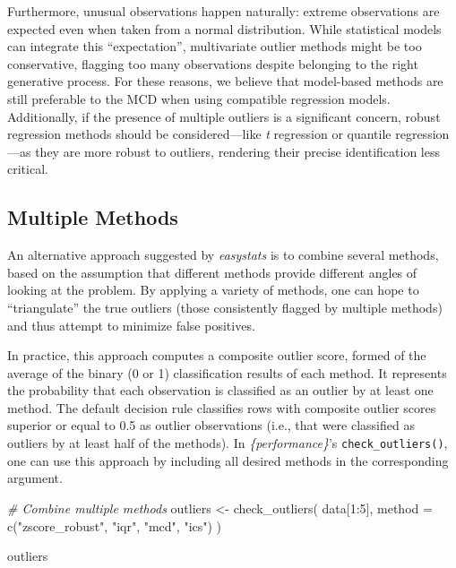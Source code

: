 \documentclass[mathematics,article,submit,moreauthors,pdftex]{mdpi}
\newenvironment{Shaded}{\begin{snugshade}}{\end{snugshade}}
\newcommand{\AttributeTok}[1]{\textcolor[rgb]{0.77,0.63,0.00}{#1}}
\newcommand{\CommentTok}[1]{\textcolor[rgb]{0.56,0.35,0.01}{\textit{#1}}}
\newcommand{\DecValTok}[1]{\textcolor[rgb]{0.00,0.00,0.81}{#1}}
\newcommand{\FunctionTok}[1]{\textcolor[rgb]{0.00,0.00,0.00}{#1}}
\newcommand{\NormalTok}[1]{#1}
\newcommand{\OtherTok}[1]{\textcolor[rgb]{0.56,0.35,0.01}{#1}}
\newcommand{\SpecialCharTok}[1]{\textcolor[rgb]{0.00,0.00,0.00}{#1}}
\newcommand{\StringTok}[1]{\textcolor[rgb]{0.31,0.60,0.02}{#1}}
\begin{document}
Furthermore, unusual observations happen naturally: extreme observations
are expected even when taken from a normal distribution. While
statistical models can integrate this ``expectation'', multivariate
outlier methods might be too conservative, flagging too many
observations despite belonging to the right generative process. For
these reasons, we believe that model-based methods are still preferable
to the MCD when using compatible regression models. Additionally, if the
presence of multiple outliers is a significant concern, robust
regression methods should be considered---like \emph{t} regression or
quantile regression---as they are more robust to outliers, rendering
their precise identification less critical.

\hypertarget{multiple-methods}{%
\subsection{Multiple Methods}\label{multiple-methods}}

An alternative approach suggested by \emph{easystats} is to combine
several methods, based on the assumption that different methods provide
different angles of looking at the problem. By applying a variety of
methods, one can hope to ``triangulate'' the true outliers (those
consistently flagged by multiple methods) and thus attempt to minimize
false positives.

In practice, this approach computes a composite outlier score, formed of
the average of the binary (0 or 1) classification results of each
method. It represents the probability that each observation is
classified as an outlier by at least one method. The default decision
rule classifies rows with composite outlier scores superior or equal to
0.5 as outlier observations (i.e., that were classified as outliers by
at least half of the methods). In \emph{\{performance\}}'s
\texttt{check\_outliers()}, one can use this approach by including all
desired methods in the corresponding argument.

\begin{Shaded}
\begin{Highlighting}[]
\CommentTok{\# Combine multiple methods}
\NormalTok{outliers }\OtherTok{\textless{}{-}} \FunctionTok{check\_outliers}\NormalTok{(}
\NormalTok{  data[}\DecValTok{1}\SpecialCharTok{:}\DecValTok{5}\NormalTok{], }
  \AttributeTok{method =} \FunctionTok{c}\NormalTok{(}\StringTok{"zscore\_robust"}\NormalTok{, }\StringTok{"iqr"}\NormalTok{, }\StringTok{"mcd"}\NormalTok{, }\StringTok{"ics"}\NormalTok{)}
\NormalTok{  )}

\NormalTok{outliers}
\end{Highlighting}
\end{Shaded}
\end{document}
